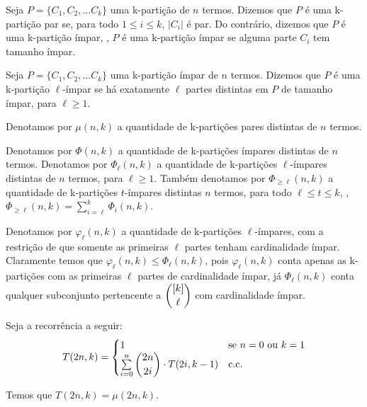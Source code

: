 \documentclass[12pt]{article}
\begin{document}
 \begin{defi}
 	\label{defi1}
 	Seja $P = \{C_1, C_2, \ldots C_k \}$ uma k-partição de $n$ termos. Dizemos que $P$ é uma k-partição par se, para todo $1 \leq i \leq k$, $|C_i|$ é par. Do contrário, dizemos que $P$ é uma k-partição ímpar, \ie, $P$ é uma k-partição ímpar se alguma parte $C_i$ tem tamanho ímpar. 
 \end{defi} \newbegin
 
 \begin{defi}
 	\label{defi2}
 	Seja $P = \{C_1, C_2, \ldots C_k \}$ uma k-partição ímpar de $n$ termos. Dizemos que $P$ é uma k-partição $\ell$-ímpar se há exatamente $\ell$ partes distintas em $P$ de tamanho ímpar, para $\ell \geq 1$.
 \end{defi} \newbegin
 
 \begin{defi}
 	\label{defi3}
 	Denotamos por $\mu(n, k)$ a quantidade de k-partições pares distintas de $n$ termos.
 \end{defi} \newbegin
 
  \begin{defi}
 	\label{defi4}
 	Denotamos por $\Phi(n, k)$ a quantidade de k-partições ímpares distintas de $n$ termos. Denotamos por $\Phi_\ell(n, k)$ a quantidade de k-partições $\ell$-ímpares distintas de $n$ termos, para $\ell \geq 1$. Também denotamos por $\Phi_{\geq \ell}(n, k)$ a quantidade de k-partições $t$-ímpares distintas $n$ termos, para todo $ \ell \leq t \leq k$, \ie, $\Phi_{\geq \ell}(n, k) = \sum\limits_{i = \ell}^{k} \Phi_{i}(n, k)$. 
 \end{defi} \newbegin
 
   \begin{defi}
 	\label{defi5}
   Denotamos por $\varphi_\ell(n, k)$ a quantidade de k-partições $\ell$-ímpares, com a restrição de que somente as primeiras $\ell$ partes tenham cardinalidade ímpar. Claramente temos que $\varphi_\ell(n, k) \leq \Phi_\ell(n, k)$, pois $\varphi_\ell(n, k)$ conta apenas as k-partições com as primeiras $\ell$ partes de cardinalidade ímpar, já $\Phi_\ell(n, k)$ conta qualquer subconjunto pertencente a $\escolhe{[k]}{\ell}$ com cardinalidade ímpar.
 \end{defi} \newbegin
 
 
 \begin{lema}  
 	\label{lema2}
 	Seja a recorrência a seguir: \\
 	
 		\begin{equation}
 		T(2n, k) =
 		\begin{cases}
 			1 & \text{se $n = 0$ ou $k = 1$} \\
 			\sum\limits_{i = 0}^{n} \escolhe{2n}{2i} \cdot T(2i, k-1) & \text{c.c.} \\ 
 		\end{cases}
 	\end{equation}
 	
 	Temos que $T(2n, k) = \mu(2n, k)$.
 \end{lema}
 
\end{document}
